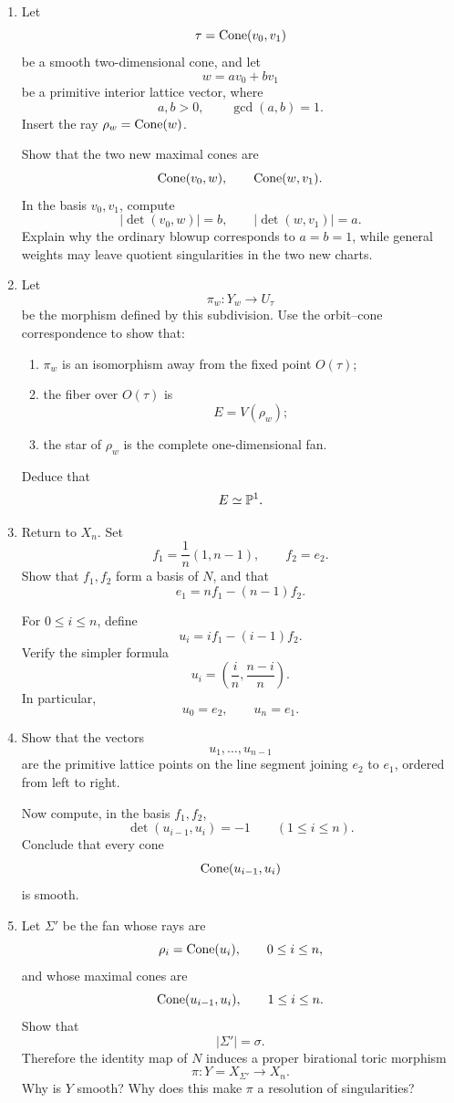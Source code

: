 \begin{enumerate}[label=\textbf{Hint \arabic*.},wide=0pt]

\item Let
\[
\tau=\operatorname{Cone}(v_0,v_1)
\]
be a smooth two-dimensional cone, and let
\[
w=av_0+bv_1
\]
be a primitive interior lattice vector, where
\[
a,b>0,
\qquad
\gcd(a,b)=1.
\]
Insert the ray \(\rho_w=\operatorname{Cone}(w)\).

Show that the two new maximal cones are
\[
\operatorname{Cone}(v_0,w),
\qquad
\operatorname{Cone}(w,v_1).
\]
In the basis \(v_0,v_1\), compute
\[
|\det(v_0,w)|=b,
\qquad
|\det(w,v_1)|=a.
\]
Explain why the ordinary blowup corresponds to \(a=b=1\), while
general weights may leave quotient singularities in the two new
charts.

\item Let
\[
\pi_w:Y_w\longrightarrow U_\tau
\]
be the morphism defined by this subdivision. Use the orbit--cone
correspondence to show that:
\begin{enumerate}[label=(\alph*),wide=0pt]
\item \(\pi_w\) is an isomorphism away from the fixed point
\(O(\tau)\);
\item the fiber over \(O(\tau)\) is
\[
E=V(\rho_w);
\]
\item the star of \(\rho_w\) is the complete one-dimensional fan.
\end{enumerate}
Deduce that
\[
E\simeq\mathbb{P}^1.
\]

\item Return to \(X_n\). Set
\[
f_1=\frac1n(1,n-1),
\qquad
f_2=e_2.
\]
Show that \(f_1,f_2\) form a basis of \(N\), and that
\[
e_1=nf_1-(n-1)f_2.
\]

For \(0\leq i\leq n\), define
\[
u_i
=
i f_1-(i-1)f_2.
\]
Verify the simpler formula
\[
u_i
=
\left(\frac{i}{n},\frac{n-i}{n}\right).
\]
In particular,
\[
u_0=e_2,
\qquad
u_n=e_1.
\]

\item Show that the vectors
\[
u_1,\ldots,u_{n-1}
\]
are the primitive lattice points on the line segment joining \(e_2\)
to \(e_1\), ordered from left to right.

Now compute, in the basis \(f_1,f_2\),
\[
\det(u_{i-1},u_i)=-1
\qquad
(1\leq i\leq n).
\]
Conclude that every cone
\[
\operatorname{Cone}(u_{i-1},u_i)
\]
is smooth.

\item Let \(\Sigma'\) be the fan whose rays are
\[
\rho_i=\operatorname{Cone}(u_i),
\qquad
0\leq i\leq n,
\]
and whose maximal cones are
\[
\operatorname{Cone}(u_{i-1},u_i),
\qquad
1\leq i\leq n.
\]
Show that
\[
|\Sigma'|=\sigma.
\]
Therefore the identity map of \(N\) induces a proper birational toric
morphism
\[
\pi:Y=X_{\Sigma'}\longrightarrow X_n.
\]
Why is \(Y\) smooth? Why does this make \(\pi\) a resolution of
singularities?


\end{enumerate}
